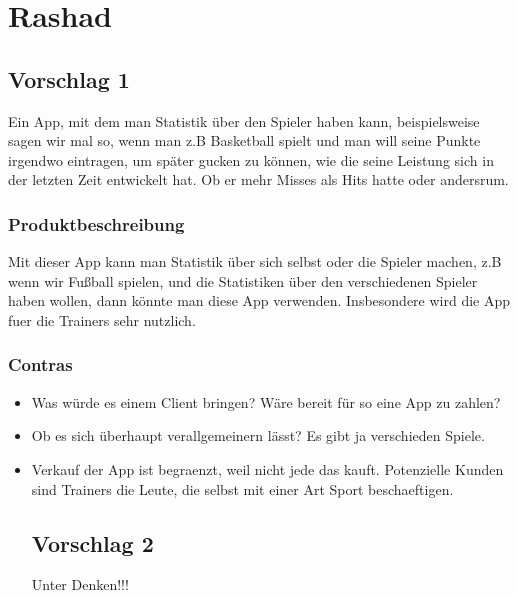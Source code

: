 \section{Rashad}

\subsection{Vorschlag 1}
Ein App, mit dem man Statistik über den Spieler haben kann, beispielsweise sagen wir mal so, wenn man z.B Basketball spielt und man will seine Punkte irgendwo eintragen, um später gucken zu können, wie die seine Leistung sich in der letzten Zeit entwickelt hat. Ob er mehr Misses als Hits hatte oder andersrum. 


\subsubsection{Produktbeschreibung}
Mit dieser App kann man Statistik über sich selbst oder die Spieler machen, z.B wenn wir Fußball spielen, und die Statistiken über den verschiedenen Spieler haben wollen, dann könnte man diese App verwenden. Insbesondere wird die App fuer die Trainers sehr nutzlich.

\vspace{0.2cm}

\subsubsection{Contras}
\begin{itemize}
\item Was würde es einem Client bringen? Wäre bereit für so eine App zu zahlen?
\item Ob es sich überhaupt verallgemeinern lässt? Es gibt ja verschieden Spiele.
\item Verkauf der App ist begraenzt, weil nicht jede das kauft. Potenzielle Kunden sind Trainers die Leute, die selbst mit einer Art Sport beschaeftigen. 

\subsection{Vorschlag 2}
Unter Denken!!!

\end{itemize}